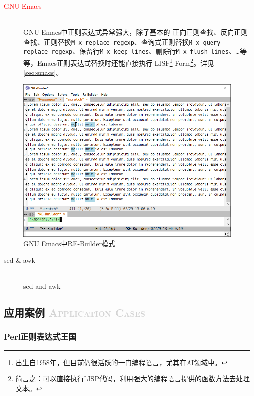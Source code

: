 \documentclass[12pt,a4paper,twoside]{ctexart}
\begin{document}
\begin{description}
\item[\textcolor{red}{GNU Emacs}] \hfill \\
  GNU Emacs中正则表达式异常强大，除了基本的 正向正则查找、反向正则查找、正则替换\texttt{M-x replace-regexp}、查询式正则替换\texttt{M-x query-replace-regexp}、保留行\texttt{M-x keep-lines}、删除行\texttt{M-x flush-lines}、\ldots 等等，Emacs正则表达式替换时还能直接执行 LISP\footnote{出生自1958年，但目前仍很活跃的一门编程语言，尤其在AI领域中。} Form\footnote{简言之：可以直接执行LISP代码，利用强大的编程语言提供的函数方法去处理文本。}。详见\ref{sec:emacs}。
\end{description}
\begin{figure}[htbp]
  \centering
  \includegraphics[width=15cm]{FIG/emacs-re-builder.png}
  \caption{GNU Emacs中RE-Builder模式}
  \label{fig:emacs-re-builder}
\end{figure}

\begin{description}
\item[sed \& awk] \hfill \\
  sed and awk
\end{description}

\subsection[应用案例]{应用案例 \textcolor{lightgray}{\textsc{Application Cases}}}
\label{sec:cases}

\subsubsection{Perl正则表达式王国}
\label{sec:perl}
\end{document}
